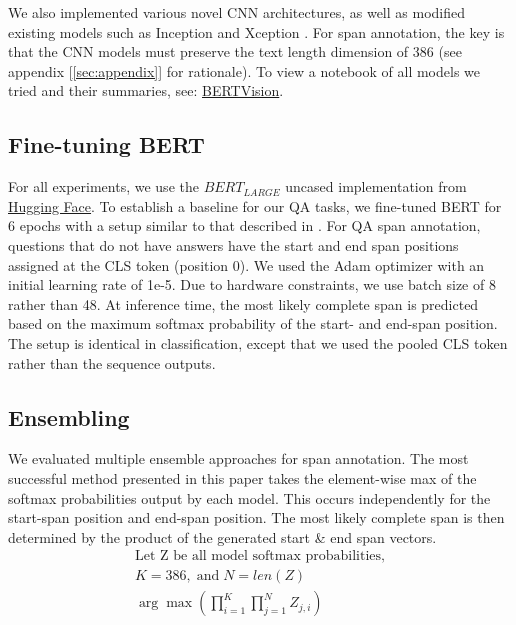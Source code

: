We also implemented various novel CNN architectures, as well as modified existing models such as Inception and Xception \citep{DBLP:journals/corr/SzegedyLJSRAEVR14, DBLP:journals/corr/Chollet16a}. For span annotation, the key is that the CNN models must preserve the text length dimension of 386 (see appendix [\ref{sec:appendix}] for rationale). To view a notebook of all models we tried and their summaries, see: \href{https://github.com/cbenge509/BERTVision}{BERTVision}.

\subsection{Fine-tuning BERT}

For all experiments, we use the $BERT_{LARGE}$ uncased implementation from \href{https://huggingface.co/}{Hugging Face}. To establish a baseline for our QA tasks, we fine-tuned BERT for 6 epochs with a setup similar to that described in \cite{Devlin2019}. For QA span annotation, questions that do not have answers have the start and end span positions assigned at the CLS token (position 0). We used the Adam optimizer with an initial learning rate of 1e-5. Due to hardware constraints, we use batch size of 8 rather than 48. At inference time, the most likely complete span is predicted based on the maximum softmax probability of the start- and end-span position. The setup is identical in classification, except that we used the pooled CLS token rather than the sequence outputs.

\subsection{Ensembling} 

We evaluated multiple ensemble approaches for span annotation. The most successful method presented in this paper takes the element-wise max of the softmax probabilities output by each model. This occurs independently for the start-span position and end-span position. The most likely complete span is then determined by the product of the generated start \& end span vectors.
\begin{equation} \label{eq2}
\begin{aligned}
\text{Let Z be all model softmax probabilities}, \\
K = 386,\;\text{and}\;N = len(Z) \\
\arg\max\left(\prod_{i=1}^{K}{\prod_{j=1}^{N}{Z_{j,i}}}\right)
\end{aligned}
\end{equation}

